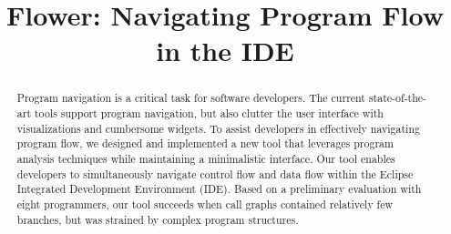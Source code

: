 \documentclass[conference]{IEEEtran}
\begin{document}
%
\title{Flower: Navigating Program Flow in the IDE}


\author{
}

\maketitle

\begin{abstract}
Program navigation is a critical task for software developers. 
The current state-of-the-art tools support program navigation, but also clutter the user interface with visualizations and cumbersome widgets.
To assist developers in effectively navigating program flow, we designed and implemented a new tool that leverages program analysis techniques while maintaining a minimalistic interface.
Our tool enables developers to simultaneously navigate control flow and data flow within the Eclipse Integrated Development Environment (IDE).
Based on a preliminary evaluation with eight programmers, our tool succeeds when call graphs contained relatively few branches, but was strained by complex program structures. 
\end{abstract}
\end{document}
